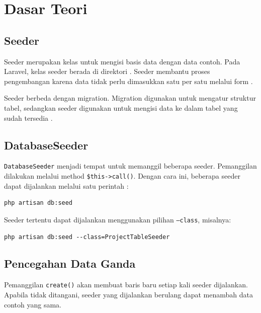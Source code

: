 \documentclass[a4paper,oneside,11pt]{book}
\renewcommand{\_}{\textunderscore\allowbreak{}}
\begin{document}
\chapter{Dasar Teori}

\section{Seeder}

Seeder merupakan kelas untuk mengisi basis data dengan data contoh.
Pada Laravel, kelas seeder berada di direktori
.
Seeder membantu proses pengembangan karena data tidak perlu dimasukkan
satu per satu melalui form \cite{laravel-seeding}.

Seeder berbeda dengan migration. Migration digunakan untuk mengatur
struktur tabel, sedangkan seeder digunakan untuk mengisi data ke dalam
tabel yang sudah tersedia \cite{laravel-seeding,laravel-migrations}.

\section{DatabaseSeeder}

\texttt{DatabaseSeeder} menjadi tempat untuk memanggil beberapa seeder.
Pemanggilan dilakukan melalui method \texttt{\$this->call()}.
Dengan cara ini, beberapa seeder dapat dijalankan melalui satu perintah \cite{laravel-seeding}:

\begin{lstlisting}[language={},caption={Menjalankan DatabaseSeeder}]
php artisan db:seed
\end{lstlisting}

Seeder tertentu dapat dijalankan menggunakan pilihan
\texttt{--class}, misalnya:

\begin{lstlisting}[language={},caption={Menjalankan satu seeder}]
php artisan db:seed --class=ProjectTableSeeder
\end{lstlisting}

\section{Pencegahan Data Ganda}

Pemanggilan \texttt{create()} akan membuat baris baru setiap kali seeder
dijalankan. Apabila tidak ditangani, seeder yang dijalankan berulang
dapat menambah data contoh yang sama.
\end{document}
